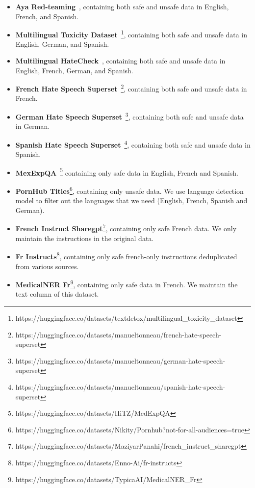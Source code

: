\begin{itemize}
    \item \textbf{Aya Red-teaming}~\citep{aakanksha2024multilingualalignmentprismaligning}, containing both safe and unsafe data in English, French, and Spanish.
    \item \textbf{Multilingual Toxicity Dataset}~\citep{dementieva2024overview}\footnote{https://huggingface.co/datasets/textdetox/multilingual\_toxicity\_dataset}, containing both safe and unsafe data in English, German, and Spanish.
    \item \textbf{Multilingual HateCheck}~\citep{rottger2022multilingual}, containing both safe and unsafe data in English, French, German, and Spanish.
    \item \textbf{French Hate Speech Superset}~\citep{tonneau-etal-2024-languages}\footnote{https://huggingface.co/datasets/manueltonneau/french-hate-speech-superset}, containing both safe and unsafe data in French.
    \item \textbf{German Hate Speech Superset}~\citep{tonneau-etal-2024-languages}\footnote{https://huggingface.co/datasets/manueltonneau/german-hate-speech-superset}, containing both safe and unsafe data in German.
    \item \textbf{Spanish Hate Speech Superset}~\citep{tonneau-etal-2024-languages}\footnote{https://huggingface.co/datasets/manueltonneau/spanish-hate-speech-superset}, containing both safe and unsafe data in Spanish.
    \item \textbf{MexExpQA}~\citep{ALONSO2024102938}\footnote{https://huggingface.co/datasets/HiTZ/MedExpQA} containing only safe data in English, French and Spanish.
    \item \textbf{PornHub Titles}\footnote{https://huggingface.co/datasets/Nikity/Pornhub?not-for-all-audiences=true}, containing only unsafe data. We use language detection model to filter out the languages that we need (English, French, Spanish and German).
    \item \textbf{French Instruct Sharegpt}\footnote{https://huggingface.co/datasets/MaziyarPanahi/french\_instruct\_sharegpt}, containing only safe French data. We only maintain the instructions in the original data.
    \item \textbf{Fr Instructs}\footnote{https://huggingface.co/datasets/Enno-Ai/fr-instructs}, containing only safe french-only instructions deduplicated from various sources.
    \item \textbf{MedicalNER Fr}\footnote{https://huggingface.co/datasets/TypicaAI/MedicalNER\_Fr}, containing only safe data in French. We maintain the text column of this dataset.

\end{itemize}
